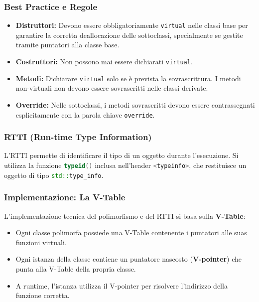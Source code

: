 \subsubsection{Best Practice e Regole}
\begin{itemize}
    \item \textbf{Distruttori:} Devono essere obbligatoriamente \lstinline|virtual| nelle classi base per garantire la corretta deallocazione delle sottoclassi, specialmente se gestite tramite puntatori alla classe base.
    \item \textbf{Costruttori:} Non possono mai essere dichiarati \lstinline|virtual|.
    \item \textbf{Metodi:} Dichiarare \texttt{virtual} solo se è prevista la sovrascrittura. I metodi non-virtuali non devono essere sovrascritti nelle classi derivate.
    \item \textbf{Override:} Nelle sottoclassi, i metodi sovrascritti devono essere contrassegnati esplicitamente con la parola chiave \texttt{override}.
\end{itemize}

\subsubsection{RTTI (Run-time Type Information)}

L'RTTI permette di identificare il tipo di un oggetto durante l'esecuzione. Si utilizza la funzione \lstinline[language=C++]|typeid()| inclusa nell'header \lstinline[language=C++]|<typeinfo>|, che restituisce un oggetto di tipo \lstinline[language=C++]|std::type_info|.



\subsubsection{Implementazione: La V-Table}

L'implementazione tecnica del polimorfismo e del RTTI si basa sulla \textbf{V-Table}:
\begin{itemize}
    \item Ogni classe polimorfa possiede una V-Table contenente i puntatori alle suas funzioni virtuali.
    \item Ogni istanza della classe contiene un puntatore nascosto (\textbf{V-pointer}) che punta alla V-Table della propria classe.
    \item A runtime, l'istanza utilizza il V-pointer per risolvere l'indirizzo della funzione corretta.
\end{itemize}

